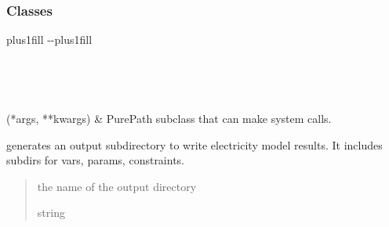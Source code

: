 \documentclass[letterpaper,10pt,english]{sphinxmanual}
\begin{document}
\subsubsection*{Classes}


\begin{savenotes}
\sphinxatlongtablestart
\sphinxthistablewithglobalstyle
\sphinxthistablewithnovlinesstyle
\makeatletter
  \LTleft \@totalleftmargin plus1fill
  \LTright\dimexpr\columnwidth-\@totalleftmargin-\linewidth\relax plus1fill
\makeatother
\begin{longtable}{}
\sphinxtoprule
\endfirsthead

\\
\sphinxtoprule
\endhead

\sphinxbottomrule
{}\\
\endfoot

\endlastfoot
\sphinxtableatstartofbodyhook

\sphinxAtStartPar
{}(*args, **kwargs)
&
\sphinxAtStartPar
PurePath subclass that can make system calls.
\\
\sphinxbottomrule
\end{longtable}
\sphinxtableafterendhook
\sphinxatlongtableend
\end{savenotes}

\begin{fulllineitems}
\label{\detokenize{src.models.electricity.scripts.postprocessor:src.models.electricity.scripts.postprocessor.make_elec_output_dir}}
\pysigstartsignatures
\pysiglinewithargsret
{}
{}
{}
\pysigstopsignatures
\sphinxAtStartPar
generates an output subdirectory to write electricity model results. It includes subdirs for
vars, params, constraints.
\begin{quote}\begin{description}
\sphinxAtStartPar
the name of the output directory

\sphinxAtStartPar
string

\end{description}\end{quote}

\end{fulllineitems}
\end{document}
